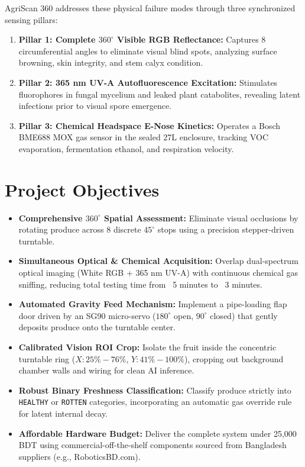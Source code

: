 \documentclass[11pt,a4paper]{article}
\begin{document}
AgriScan 360 addresses these physical failure modes through three synchronized sensing pillars:
\begin{enumerate}[leftmargin=*]
    \item \textbf{Pillar 1: Complete $360^\circ$ Visible RGB Reflectance:} Captures 8 circumferential angles to eliminate visual blind spots, analyzing surface browning, skin integrity, and stem calyx condition.
    \item \textbf{Pillar 2: 365 nm UV-A Autofluorescence Excitation:} Stimulates fluorophores in fungal mycelium and leaked plant catabolites, revealing latent infections prior to visual spore emergence.
    \item \textbf{Pillar 3: Chemical Headspace E-Nose Kinetics:} Operates a Bosch BME688 MOX gas sensor in the sealed 27L enclosure, tracking VOC evaporation, fermentation ethanol, and respiration velocity.
\end{enumerate}

\section{Project Objectives}
\begin{itemize}[leftmargin=*]
    \item \textbf{Comprehensive $360^\circ$ Spatial Assessment:} Eliminate visual occlusions by rotating produce across 8 discrete $45^\circ$ stops using a precision stepper-driven turntable.
    \item \textbf{Simultaneous Optical \& Chemical Acquisition:} Overlap dual-spectrum optical imaging (White RGB + 365 nm UV-A) with continuous chemical gas sniffing, reducing total testing time from ~5 minutes to ~3 minutes.
    \item \textbf{Automated Gravity Feed Mechanism:} Implement a pipe-loading flap door driven by an SG90 micro-servo ($180^\circ$ open, $90^\circ$ closed) that gently deposits produce onto the turntable center.
    \item \textbf{Calibrated Vision ROI Crop:} Isolate the fruit inside the concentric turntable ring ($X: 25\% - 76\%$, $Y: 41\% - 100\%$), cropping out background chamber walls and wiring for clean AI inference.
    \item \textbf{Robust Binary Freshness Classification:} Classify produce strictly into \texttt{HEALTHY} or \texttt{ROTTEN} categories, incorporating an automatic gas override rule for latent internal decay.
    \item \textbf{Affordable Hardware Budget:} Deliver the complete system under 25,000 BDT using commercial-off-the-shelf components sourced from Bangladesh suppliers (e.g., RoboticsBD.com).
\end{itemize}
\end{document}
